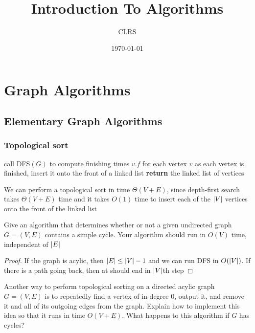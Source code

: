 \documentclass[11pt]{article}
\author{CLRS}
\date{\today}
\title{Introduction To Algorithms}
\begin{document}
\maketitle
\tableofcontents



\section{Graph Algorithms}
\label{sec:org1235130}
\subsection{Elementary Graph Algorithms}
\label{sec:org36620c5}
\subsubsection{Topological sort}
\label{sec:org9cf1671}
\begin{algorithmic}[1]
\State call DFS\((G)\) to compute finishing times \(v.f\) for each vertex \(v\)
\State as each vertex is finished, insert it onto the front of a linked list
\State \textbf{return} the linked list of vertices
\EndProcedure
\end{algorithmic}

We can perform a topological sort in time \(\Theta(V+E)\), since depth-first search takes \(\Theta(V+E)\)
time and it takes \(O(1)\) time to insert each of the \(\abs{V}\) vertices onto the front of the
linked list

\begin{exercise}[22.4-3]
Give an algorithm that determines whether or not a given undirected graph \(G=(V,E)\) contains a
simple cycle. Your algorithm should run in \(O(V)\) time, independent of \(\abs{E}\)
\end{exercise}

\begin{proof}
If the graph is acylic, then \(\abs{E}\le\abs{V}-1\) and we can run DFS in \(O(\abs{V})\). If
there is a path going back, then at should end in \(\abs{V}\)th step
\end{proof}

\begin{exercise}[22.4-5]
Another way to perform topological sorting on a directed acylic graph \(G=(V,E)\) is to
repeatedly find a vertex of in-degree 0, output it, and remove it and all of its outgoing edges
from the graph. Explain how to implement this idea so that it runs in time \(O(V+E)\). What
happens to this algorithm if \(G\) has cycles?
\end{exercise}
\end{document}
